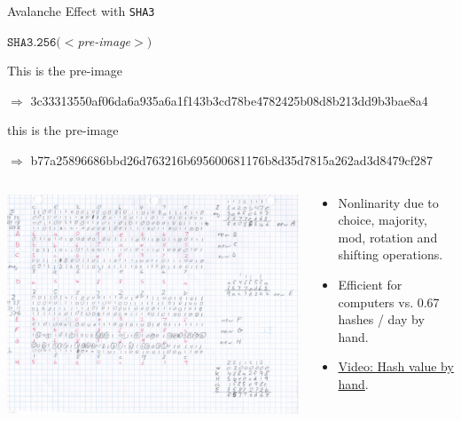 \documentclass[handout]{beamer}
\begin{document}
\begin{frame}{Avalanche Effect with \texttt{SHA3}}

\begin{center}
$\texttt{SHA3.256}(<$\textit{pre-image}$>)$
\end{center}

This is the pre-image

$\Rightarrow$ \footnotesize 3c33313550af06da6a935a6a1f143b3cd78be4782425b08d8b213dd9b3bae8a4 \normalsize
\vspace{1em}

\color{focus}t\color{black}his is the pre-image

$\Rightarrow$ \footnotesize \color{focus}b77a25896686bbd26d763216b695600681176b8d35d7815a262ad3d8479cf287 \color{black} \normalsize
\vspace{1em}

\begin{columns}[T]
	\begin{column}{0.35\textwidth}
		\includegraphics[width = 4 cm, frame]{../assets/images/manual_hashing_video.png}
	\end{column} %
	\begin{column}{0.65\textwidth}
		\begin{itemize}
			\item Nonlinarity due to choice, majority, mod, rotation and shifting operations.
			\item Efficient for computers vs. 0.67 hashes / day by hand.
			\item \link \href{https://www.youtube.com/watch?v=y3dqhixzGVo}{Video: Hash value by hand}.
		\end{itemize}
	\end{column}
\end{columns}
	
\end{frame}
\end{document}
